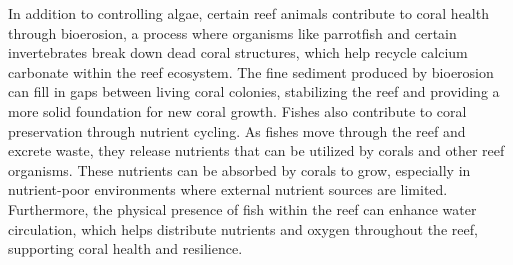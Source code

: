 
In addition to controlling algae, certain reef animals contribute to coral health through bioerosion, a process where organisms like parrotfish and certain invertebrates break down dead coral structures, which help recycle calcium carbonate within the reef ecosystem. The fine sediment produced by bioerosion can fill in gaps between living coral colonies, stabilizing the reef and providing a more solid foundation for new coral growth. 
Fishes also contribute to coral preservation through nutrient cycling. As fishes move through the reef and excrete waste, they release nutrients that can be utilized by corals and other reef organisms. These nutrients can be absorbed by corals to grow, especially in nutrient-poor environments where external nutrient sources are limited. Furthermore, the physical presence of fish within the reef can enhance water circulation, which helps distribute nutrients and oxygen throughout the reef, supporting coral health and resilience.

